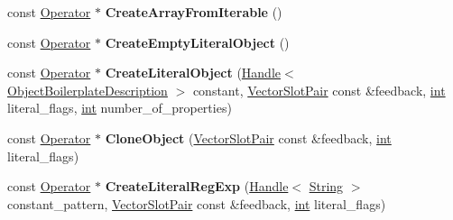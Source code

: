 \begin{DoxyCompactItemize}
\item 
\mbox{\label{classv8_1_1internal_1_1compiler_1_1JSOperatorBuilder_a8e28a762b39452879066a87a129a13ce}} 
const \mbox{\hyperlink{classv8_1_1internal_1_1compiler_1_1Operator}{Operator}} $\ast$ {\bfseries Create\+Array\+From\+Iterable} ()
\item 
\mbox{\label{classv8_1_1internal_1_1compiler_1_1JSOperatorBuilder_aa82ff8b1e101250ad5b63d46f8ec1c0c}} 
const \mbox{\hyperlink{classv8_1_1internal_1_1compiler_1_1Operator}{Operator}} $\ast$ {\bfseries Create\+Empty\+Literal\+Object} ()
\item 
\mbox{\label{classv8_1_1internal_1_1compiler_1_1JSOperatorBuilder_a99168067d34e7af7e8d214e71b12e3cf}} 
const \mbox{\hyperlink{classv8_1_1internal_1_1compiler_1_1Operator}{Operator}} $\ast$ {\bfseries Create\+Literal\+Object} (\mbox{\hyperlink{classv8_1_1internal_1_1Handle}{Handle}}$<$ \mbox{\hyperlink{classv8_1_1internal_1_1ObjectBoilerplateDescription}{Object\+Boilerplate\+Description}} $>$ constant, \mbox{\hyperlink{classv8_1_1internal_1_1VectorSlotPair}{Vector\+Slot\+Pair}} const \&feedback, \mbox{\hyperlink{classint}{int}} literal\+\_\+flags, \mbox{\hyperlink{classint}{int}} number\+\_\+of\+\_\+properties)
\item 
\mbox{\label{classv8_1_1internal_1_1compiler_1_1JSOperatorBuilder_a1093548148ee03d2d266398d8906eecb}} 
const \mbox{\hyperlink{classv8_1_1internal_1_1compiler_1_1Operator}{Operator}} $\ast$ {\bfseries Clone\+Object} (\mbox{\hyperlink{classv8_1_1internal_1_1VectorSlotPair}{Vector\+Slot\+Pair}} const \&feedback, \mbox{\hyperlink{classint}{int}} literal\+\_\+flags)
\item 
\mbox{\label{classv8_1_1internal_1_1compiler_1_1JSOperatorBuilder_ac7c17bbbb17ff09240a011e2743716ed}} 
const \mbox{\hyperlink{classv8_1_1internal_1_1compiler_1_1Operator}{Operator}} $\ast$ {\bfseries Create\+Literal\+Reg\+Exp} (\mbox{\hyperlink{classv8_1_1internal_1_1Handle}{Handle}}$<$ \mbox{\hyperlink{classv8_1_1internal_1_1String}{String}} $>$ constant\+\_\+pattern, \mbox{\hyperlink{classv8_1_1internal_1_1VectorSlotPair}{Vector\+Slot\+Pair}} const \&feedback, \mbox{\hyperlink{classint}{int}} literal\+\_\+flags)

\end{DoxyCompactItemize}
